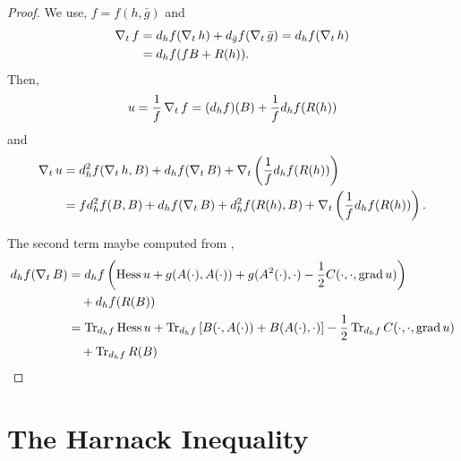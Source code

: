 \documentclass{amsart}
\begin{document}
\begin{proof}
We use, $f = f(h, \bar{g})$ and
\[
\begin{split}
\operatorname{\nabla}_t f &= d_h f (\operatorname{\nabla}_t h) + d_{\bar{g}} f(\operatorname{\nabla}_t \bar{g}) = d_h f (\operatorname{\nabla}_t h) \\
&= d_h f (fB + R(h)).
\end{split}
\]
Then,
\[
u = \frac{1}{f} \operatorname{\nabla}_t f = (d_h f) (B) + \frac{1}{f} d_h f(R(h))
\]
and
\[
\begin{split}
\operatorname{\nabla}_t u &= d^2_h f (\operatorname{\nabla}_t h, B) + d_h f(\operatorname{\nabla}_t B) + \operatorname{\nabla}_t \left(\frac{1}{f} d_h f(R(h))\right) \\
&= f d^2_h f(B, B) + d_h f(\operatorname{\nabla}_t B) + d^2_h f (R(h), B) + \operatorname{\nabla}_t \left(\frac{1}{f} d_h f(R(h))\right).
\end{split}
\]

The second term maybe computed from ,
\[
\begin{split}
d_h f(\operatorname{\nabla}_t B) &= d_h f \left(\operatorname{Hess} u + g(A(\cdot), A(\cdot)) + g(A^2(\cdot), \cdot) - \frac{1}{2} C(\cdot, \cdot, \operatorname{grad} u)\right) \\
&\quad + d_h f (R(B)) \\
&= \operatorname{Tr}_{d_h f} \operatorname{Hess} u + \operatorname{Tr}_{d_h f} \left[B(\cdot, A(\cdot)) + B(A(\cdot), \cdot)\right] -\frac{1}{2} \operatorname{Tr}_{d_h f} C(\cdot, \cdot, \operatorname{grad} u) \\
&\quad + \operatorname{Tr}_{d_h f} R(B)
\end{split}
\]

\end{proof}

\section{The Harnack Inequality}
\end{document}
